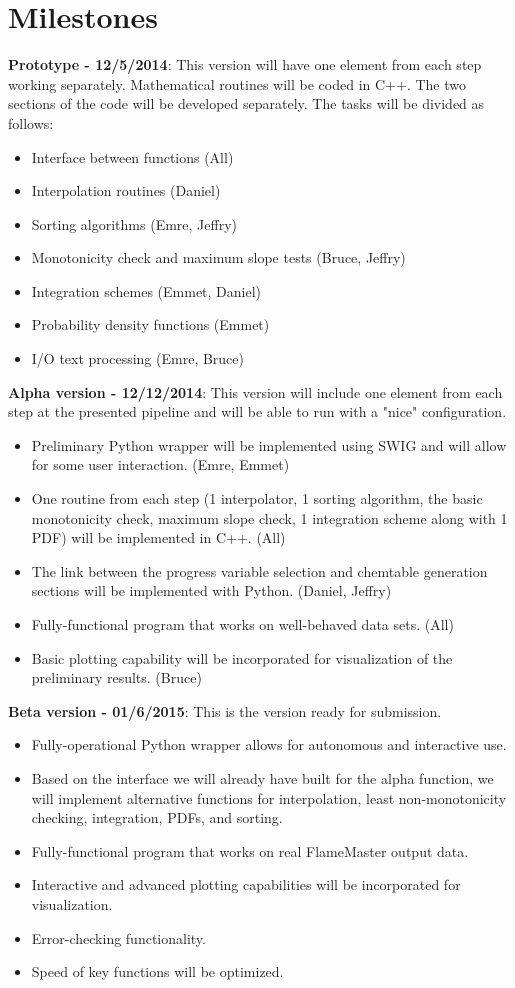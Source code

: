 \documentclass[11pt]{article}
\begin{document}
\section{Milestones}
\textbf{Prototype - 12/5/2014}: This version will have one element from each step working separately. Mathematical routines will be coded in C++. The two sections of the code will be developed separately. The tasks will be divided as follows:
\begin{itemize}
\item Interface between functions (All)
\item Interpolation routines (Daniel)
\item Sorting algorithms (Emre, Jeffry)
\item Monotonicity check and maximum slope tests (Bruce, Jeffry)
\item Integration schemes (Emmet, Daniel)
\item Probability density functions (Emmet)
\item I/O text processing (Emre, Bruce)
\end{itemize}

\textbf{Alpha version - 12/12/2014}: This version will include one element from each step at the presented pipeline and will be able to run with a "nice" configuration.
\begin{itemize}
\item Preliminary Python wrapper will be implemented using SWIG and will allow for some user interaction. (Emre, Emmet) 
\item One routine from each step (1 interpolator, 1 sorting algorithm, the basic monotonicity check, maximum slope check, 1 integration scheme along with 1 PDF) will be implemented in C++. (All)
\item The link between the progress variable selection and chemtable generation sections will be implemented with Python. (Daniel, Jeffry)
\item Fully-functional program that works on well-behaved data sets. (All)
\item Basic plotting capability will be incorporated for visualization of the preliminary results.  (Bruce)
\end{itemize}

\textbf{Beta version - 01/6/2015}: This is the version ready for submission.
\begin{itemize}
\item Fully-operational Python wrapper allows for autonomous and interactive use.
\item Based on the interface we will already have built for the alpha function, we will implement alternative functions for interpolation, least non-monotonicity checking, integration, PDFs, and sorting.
\item Fully-functional program that works on real FlameMaster output data.
\item Interactive and advanced plotting capabilities will be incorporated for visualization.
\item Error-checking functionality.
\item Speed of key functions will be optimized.
\end{itemize}
\end{document}

